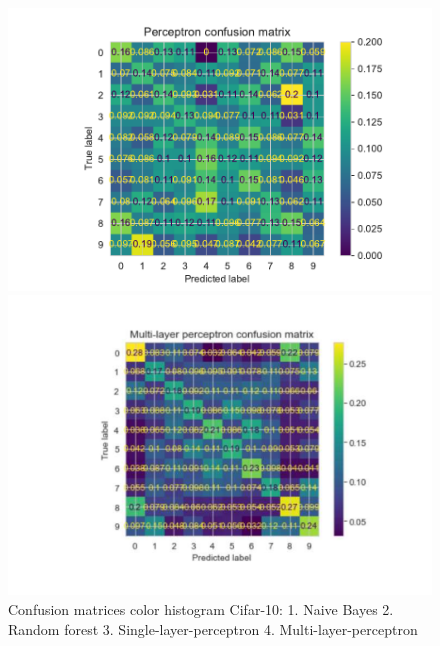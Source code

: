 \documentclass[11pt]{article}
\begin{document}
\begin{figure}[H]
\begin{minipage}[c]{0.5\textwidth}
\end{minipage}
\begin{minipage}[c]{0.5\textwidth}
\includegraphics[width=1\linewidth]{figures/Cifar/CM__ppn_color_hist.pdf}
\end{minipage}
\begin{minipage}[c]{0.5\textwidth}
\includegraphics[width=1\linewidth]{figures/Cifar/CM__MLP_color_hist.pdf}
\end{minipage}
\caption{Confusion matrices color histogram Cifar-10: 1. Naive Bayes 2. Random forest 3. Single-layer-perceptron 4. Multi-layer-perceptron}
\label{CV_Matrices_Cifar_color_hist}
\end{figure}
\end{document}
